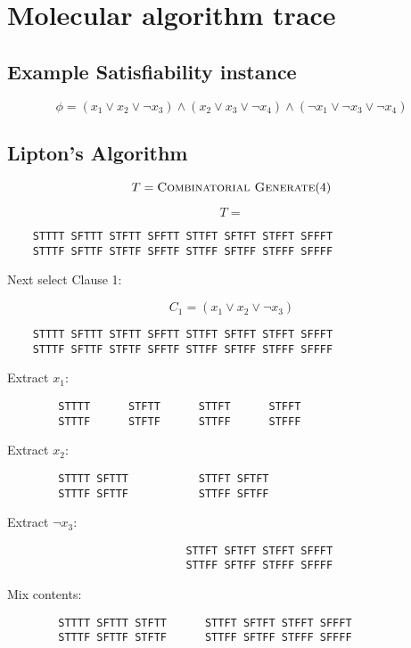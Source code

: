 
\chapter{Molecular algorithm trace}

\section{Example {\sc Satisfiability} instance}


\[
 \phi = (x_1 \vee x_2 \vee \neg x_3) \wedge  (x_2 \vee x_3 \vee \neg x_4) \wedge (\neg x_1 \vee \neg x_3 \vee \neg x_4)
\]


\section{Lipton's Algorithm}

\[
T  = \text{{\sc Combinatorial Generate}}(4)
\]

\[
T = 
\]
\begin{verbatim}
	STTTT SFTTT STFTT SFFTT STTFT SFTFT STFFT SFFFT
	STTTF SFTTF STFTF SFFTF STTFF SFTFF STFFF SFFFF
\end{verbatim}
	
Next select Clause 1:

\[
C_1 = (x_1 \vee x_2 \vee \neg x_3)
\]

\begin{verbatim}
	STTTT SFTTT STFTT SFFTT STTFT SFTFT STFFT SFFFT
	STTTF SFTTF STFTF SFFTF STTFF SFTFF STFFF SFFFF
\end{verbatim}
	
	Extract $x_1$:

\begin{verbatim}
		STTTT      STFTT      STTFT      STFFT     
		STTTF      STFTF      STTFF      STFFF     
\end{verbatim}

	Extract $x_2$:
\begin{verbatim}
		STTTT SFTTT           STTFT SFTFT          
		STTTF SFTTF           STTFF SFTFF          
\end{verbatim}

	Extract $\neg x_3$:
\begin{verbatim}	
		                    STTFT SFTFT STFFT SFFFT
		                    STTFF SFTFF STFFF SFFFF
\end{verbatim}		                    

	Mix contents:

\begin{verbatim}	
		STTTT SFTTT STFTT      STTFT SFTFT STFFT SFFFT
		STTTF SFTTF STFTF      STTFF SFTFF STFFF SFFFF
\end{verbatim}		

